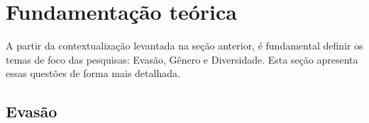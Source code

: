 \documentclass[12pt]{article}
\begin{document}




\section{Fundamentação teórica}
\label{sec:fundamentacaoteorica}


A partir da contextualização levantada na seção anterior, é fundamental definir os temas de foco das pesquisas: Evasão, Gênero e Diversidade. Esta seção apresenta essas questões de forma mais detalhada.

\subsection{Evasão}
\label{subsec:evasao}
\end{document}
